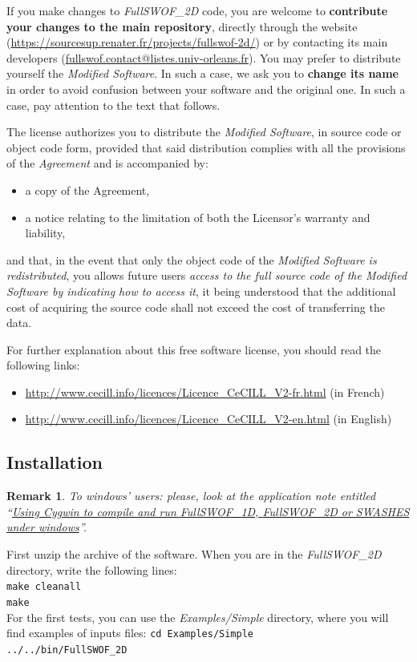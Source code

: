 \documentclass[a4paper, 11pt]{article}
\makeatletter
\newcommand{\FullSWOF}{\emph{FullSWOF\_2D}}
\newcommand{\contactFS}{\href{mailto:fullswof.contact@listes.univ-orleans.fr}{fullswof.contact@listes.univ-orleans.fr}}
\newcommand{\MainWebSite}{\url{https://sourcesup.renater.fr/projects/fullswof-2d/}}
\newtheorem{rmk}{Remark}
\makeatother
\begin{document}
If you make changes to \FullSWOF{} code, you are welcome to \textbf{contribute your changes to the main repository}, directly through the website (\MainWebSite) or by contacting its main developers (\contactFS).
You may prefer to distribute yourself the \emph{Modified Software}. In such a case, we ask you to \textbf{change its name} in order to avoid confusion between your software and the original one. In such a case, pay attention to the text that follows.

The license authorizes you to distribute the \emph{Modified Software}, in source code or object code form, provided that said distribution complies with all the provisions of the \emph{Agreement} and is accompanied by:
\begin{itemize}
\item a copy of the Agreement,
\item a notice relating to the limitation of both the Licensor's warranty and liability,
\end{itemize}
and that, in the event that only the object code of the \emph{Modified Software is redistributed}, you allows future users \emph{access to the full source code of the Modified Software by indicating how to access it}, it being understood that the additional cost of acquiring the source code shall not exceed the cost of transferring the data.

For further explanation about this free software license, you should read the following links:
\begin{itemize}
\item \url{http://www.cecill.info/licences/Licence\_CeCILL\_V2-fr.html} (in French)
\item \url{http://www.cecill.info/licences/Licence\_CeCILL\_V2-en.html} (in English)
\end{itemize}

\subsection{Installation}
\begin{rmk}
To windows' users: please, look at the application note entitled ``\href{https://sourcesup.renater.fr/docman/view.php/895/3949/AppNote-windows.pdf}{Using Cygwin to compile and run  \emph{FullSWOF\_1D}, \FullSWOF{} or \emph{SWASHES} under windows}''.
\end{rmk}

First unzip the archive of the software. 
When you are in the \FullSWOF{} directory, write the following lines:\\
\verb!make cleanall!\\
\verb!make!\\
For the first tests, you can use the \textit{Examples/Simple} directory, where you will find examples of inputs files:
\verb!cd Examples/Simple!\\
\verb!../../bin/FullSWOF_2D !
\end{document}
